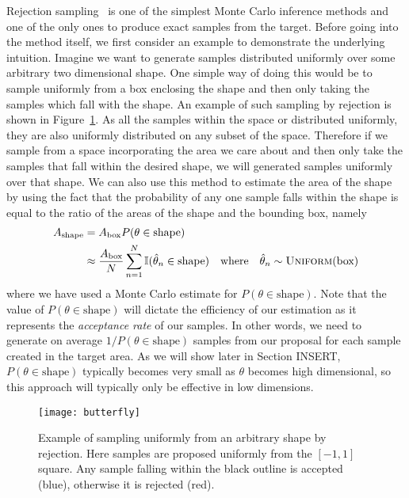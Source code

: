 
Rejection sampling~\citep{robert2004monte} is one of the simplest Monte Carlo 
inference methods and one of the only ones to produce exact samples from 
the target.  Before going into the method itself, we first consider an example to
demonstrate the underlying intuition.  Imagine we want to generate samples 
distributed uniformly over some arbitrary two dimensional shape.  One simple
way of doing this would be to sample uniformly from a box enclosing the
shape and then only taking the samples which fall with the shape.
An example of such sampling by rejection is shown in Figure~\ref{fig:inf:rej-butt}.
As all the samples within the space or distributed uniformly, they are also
uniformly distributed on any subset of the space.  Therefore if we sample
from a space incorporating the area we care about and then only take the samples
that fall within the desired shape, we will generated samples uniformly over
that shape. We can also use this method to estimate the area of the shape by using
the fact that the probability of any one sample falls within the shape is equal to
the ratio of the areas of the shape and the bounding box, namely
\begin{align}
A_{\text{shape}} &= A_{\text{box}}	P(\theta \in \text{shape}) \\
&\approx \frac{A_{\mathrm{box}}}{N} \sum_{n=1}^{N} \mathbb{I} (\hat{\theta}_n \in \text{shape})
\quad \text{where} \quad \hat{\theta}_n \sim \textsc{Uniform}(\text{box})
\end{align}
where we have used a Monte Carlo estimate for $P(\theta \in \text{shape})$.
Note that the value of $P(\theta \in \text{shape})$ will
dictate the efficiency of our estimation as it represents the \emph{acceptance rate}
of our samples.  In other words, we need to generate on average $1/P(\theta \in \text{shape})$
samples from our proposal for each sample created in the target area.  As we
will show later in Section INSERT, $P(\theta \in \text{shape})$ typically becomes very
small as $\theta$ becomes high dimensional, so this approach will typically only
be effective in low dimensions.

\begin{figure}[t]
	\centering
	\texttt{[image: butterfly]}
	\caption{Example of sampling uniformly from an arbitrary shape by 
		rejection.  Here samples are proposed uniformly from the $[-1,1]$
		square.  Any sample falling within the black outline is accepted 
		(blue), otherwise it is rejected (red).  \label{fig:inf:rej-butt}}
\end{figure}

